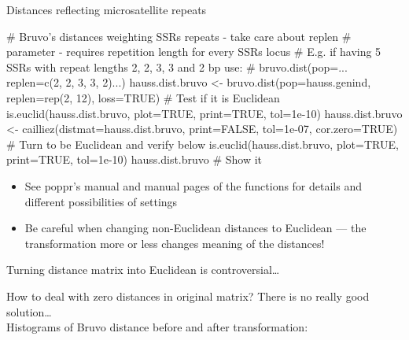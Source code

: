 \documentclass[compress, ucs, xelatex, 11pt, xcolor=svgnames, aspectratio=169,
	hyperref={
		bookmarks=true,
		unicode=true,
		colorlinks=true,
		pdftitle={Molecular data in R},
		plainpages=false,
		pdfauthor={Vojtech Zeisek},
		pdfsubject={Course about phylogeny and evolution in R},
		pdfcreator={XeLaTeX},
		pdfkeywords={R, evolution, phylogeny, molecular data},
		linkcolor=Crimson, %
		anchorcolor=Magenta, %
		citecolor=Magenta, %
		filecolor=Magenta, %
		menucolor=Magenta, %
		urlcolor=DodgerBlue, %
		pdftex},
	url={hyphens, lowtilde} %
	]{beamer}
\renewcommand{\texttt}[1]{\colorbox{Beige}{{\ttfamily #1}}}
\begin{document}
\begin{frame}[fragile]{Distances reflecting microsatellite repeats}
	\begin{spluscode}
    # Bruvo's distances weighting SSRs repeats - take care about replen
    # parameter - requires repetition length for every SSRs locus
    # E.g. if having 5 SSRs with repeat lengths 2, 2, 3, 3 and 2 bp use:
    # bruvo.dist(pop=... replen=c(2, 2, 3, 3, 2)...)
    hauss.dist.bruvo <- bruvo.dist(pop=hauss.genind, replen=rep(2, 12),
      loss=TRUE)
    # Test if it is Euclidean
    is.euclid(hauss.dist.bruvo, plot=TRUE, print=TRUE, tol=1e-10)
    hauss.dist.bruvo <- cailliez(distmat=hauss.dist.bruvo, print=FALSE,
      tol=1e-07, cor.zero=TRUE) # Turn to be Euclidean and verify below
    is.euclid(hauss.dist.bruvo, plot=TRUE, print=TRUE, tol=1e-10)
    hauss.dist.bruvo  # Show it
	\end{spluscode}
	\begin{itemize}
		\item See poppr's manual and manual pages of the functions for details and different possibilities of settings
		\item Be careful when changing non-Euclidean distances to Euclidean --- \alert{the transformation more or less changes meaning of the distances!}
	\end{itemize}
\end{frame}

\begin{frame}{Turning distance matrix into Euclidean is controversial\ldots}
	\begin{footnotesize}
		How to deal with zero distances in original matrix? There is no really good solution\ldots\\ Histograms of Bruvo distance before and after transformation:
	\end{footnotesize}
	\begin{center}
		\texttt{[image: bruvodist.png]}
	\end{center}
\end{frame}
\end{document}
